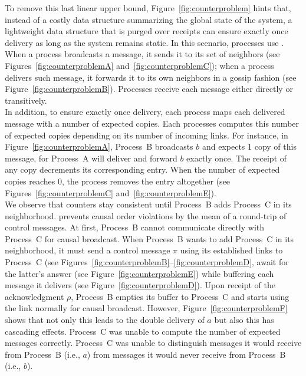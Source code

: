 To remove this last linear upper bound, Figure~\ref{fig:counterproblem} hints
that, instead of a costly data structure summarizing the global state of the
system, a lightweight data structure that is purged over receipts can ensure
exactly once delivery as long as the system remains static. In this scenario,
processes use \PCBROADCAST. When a process broadcasts a message, it sends it to
its set of neighbors (see Figures~\ref{fig:counterproblemA}
and~\ref{fig:counterproblemC}); when a process delivers such message, it
forwards it to its own neighbors in a gossip fashion (see
Figure~\ref{fig:counterproblemB}). Processes receive each message either
directly or transitively.\\
In addition, to ensure exactly once delivery, each process maps each delivered
message with a number of expected copies. Each processes computes this number of
expected copies depending on its number of incoming links. For instance, in
Figure~\ref{fig:counterproblemA}, Process~B broadcasts $b$ and expects 1 copy of
this message, for Process~A will deliver and forward $b$ exactly once. The
receipt of any copy decrements its corresponding entry.  When the number of
expected copies reaches 0, the process removes the entry altogether (see
Figures~\ref{fig:counterproblemC} and~\ref{fig:counterproblemE}).\\ We observe
that counters stay consistent until Process~B adds Process~C in its
neighborhood. \PCBROADCAST prevents causal order violations by the mean of a
round-trip of control messages.  At first, Process~B cannot communicate directly
with Process~C for causal broadcast. When Process~B wants to add Process~C in
its neighborhood, it must send a control message $\pi$ using its established
links to Process~C (see
Figures~\ref{fig:counterproblemB}--\ref{fig:counterproblemD}, await for the
latter's answer (see Figure~\ref{fig:counterproblemE}) while buffering each
message it delivers (see Figure~\ref{fig:counterproblemD}). Upon receipt of the
acknowledgment $\rho$, Process~B empties its buffer to Process~C and starts
using the link normally for causal broadcast. However,
Figure~\ref{fig:counterproblemF} shows that not only this leads to the double
delivery of $a$ but also this has cascading effects. Process~C was unable to
compute the number of expected messages correctly. Process~C was unable to
distinguish messages it would receive from Process~B (i.e., $a$) from messages
it would never receive from Process~B (i.e., $b$).

